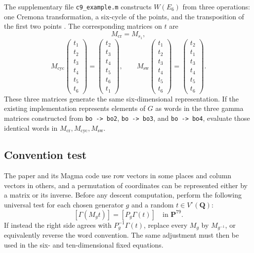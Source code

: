 \documentclass[11pt]{article}
\newcommand{\QQ}{\mathbf{Q}}
\newcommand{\PP}{\mathbf{P}}
\begin{document}
The supplementary file \texttt{c9\_example.m} constructs $W(E_6)$ from three
operations: one Cremona transformation, a six-cycle of the points, and the
transposition of the first two points \cite{EJcode}.  The corresponding matrices on
$t$ are
\[
 M_{\mathrm{cr}}=M_{s_1},
\]
\[
 M_{\mathrm{cyc}}
 \begin{pmatrix}t_1\\t_2\\t_3\\t_4\\t_5\\t_6\end{pmatrix}
 =
 \begin{pmatrix}t_2\\t_3\\t_4\\t_5\\t_6\\t_1\end{pmatrix},
 \qquad
 M_{\mathrm{sw}}
 \begin{pmatrix}t_1\\t_2\\t_3\\t_4\\t_5\\t_6\end{pmatrix}
 =
 \begin{pmatrix}t_2\\t_1\\t_3\\t_4\\t_5\\t_6\end{pmatrix}.
\]
These three matrices generate the same six-dimensional representation.  If the
existing implementation represents elements of $G$ as words in the three gamma
matrices constructed from \texttt{bo -> bo2}, \texttt{bo -> bo3}, and
\texttt{bo -> bo4}, evaluate those identical words in
$M_{\mathrm{cr}},M_{\mathrm{cyc}},M_{\mathrm{sw}}$.

\subsection{Convention test}

The paper and its Magma code use row vectors in some places and column vectors in
others, and a permutation of coordinates can be represented either by a matrix or
its inverse.  Before any descent computation, perform the following universal test
for each chosen generator $g$ and a random $t\in V^\circ(\QQ)$:
\[
  [\Gamma(M_gt)]=[P_g\Gamma(t)]
  \quad\text{in }\PP^{79}.
\]
If instead the right side agrees with $P_g^{-1}\Gamma(t)$, replace every $M_g$ by
$M_{g^{-1}}$, or equivalently reverse the word convention.  The same adjustment
must then be used in the six- and ten-dimensional fixed equations.
\end{document}
